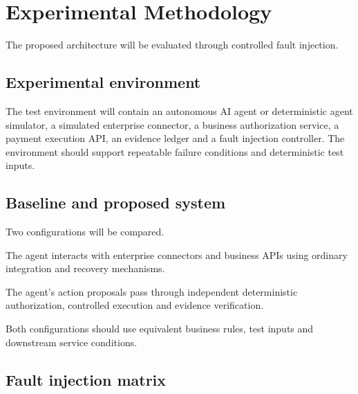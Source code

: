 \documentclass[11pt,a4paper]{article}
\begin{document}
\section{Experimental Methodology}

The proposed architecture will be evaluated through controlled fault injection.

\subsection{Experimental environment}

The test environment will contain an autonomous AI agent or deterministic agent simulator, a simulated enterprise connector, a business authorization service, a payment execution API, an evidence ledger and a fault injection controller. The environment should support repeatable failure conditions and deterministic test inputs.

\subsection{Baseline and proposed system}

Two configurations will be compared.
\begin{description}[leftmargin=2.4em,style=nextline]
  \item[Baseline A: Conventional agentic execution.] The agent interacts with enterprise connectors and business APIs using ordinary integration and recovery mechanisms.
  \item[System B: RAEA with Parmana.] The agent's action proposals pass through independent deterministic authorization, controlled execution and evidence verification.
\end{description}
Both configurations should use equivalent business rules, test inputs and downstream service conditions.

\subsection{Fault injection matrix}
\end{document}
